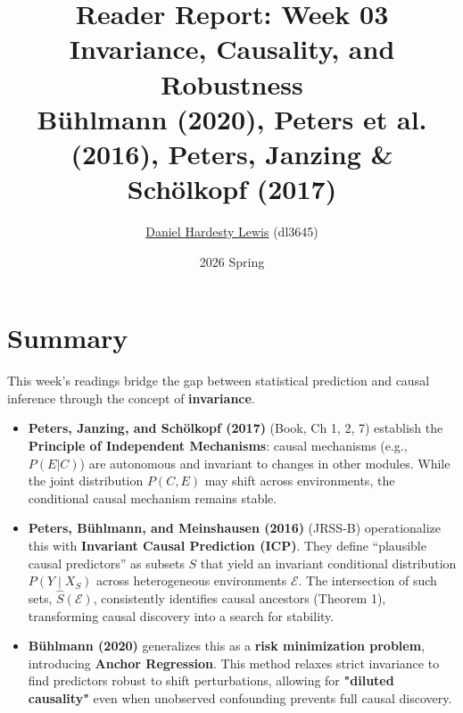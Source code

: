 \documentclass[11pt]{article}
\title{\vspace{-2em}\textbf{Reader Report: Week 03} \\ \vspace{0.2em} \large Invariance, Causality, and Robustness \\ \footnotesize Bühlmann (2020), Peters et al. (2016), Peters, Janzing \& Schölkopf (2017)}
\author{\href{https://github.com/dhardestylewis}{Daniel Hardesty Lewis} (dl3645)}
\date{2026 Spring}
\begin{document}
\maketitle
\thispagestyle{fancy}
\vspace{-1em}

\section*{Summary}
This week's readings bridge the gap between statistical prediction and causal inference through the concept of \textbf{invariance}.
\begin{itemize}
    \item \textbf{Peters, Janzing, and Schölkopf (2017)} (Book, Ch 1, 2, 7) establish the \textbf{Principle of Independent Mechanisms}: causal mechanisms (e.g., $P(E|C)$) are autonomous and invariant to changes in other modules. While the joint distribution $P(C, E)$ may shift across environments, the conditional causal mechanism remains stable.
    \item \textbf{Peters, Bühlmann, and Meinshausen (2016)} (JRSS-B) operationalize this with \textbf{Invariant Causal Prediction (ICP)}. They define ``plausible causal predictors'' as subsets $S$ that yield an invariant conditional distribution $P(Y \mid X_S)$ across heterogeneous environments $\mathcal{E}$. The intersection of such sets, $\hat{S}(\mathcal{E})$, consistently identifies causal ancestors (Theorem 1), transforming causal discovery into a search for stability.
    \item \textbf{Bühlmann (2020)} generalizes this as a \textbf{risk minimization problem}, introducing \textbf{Anchor Regression}. This method relaxes strict invariance to find predictors robust to shift perturbations, allowing for \textbf{"diluted causality"} even when unobserved confounding prevents full causal discovery.
\end{itemize}
\end{document}

